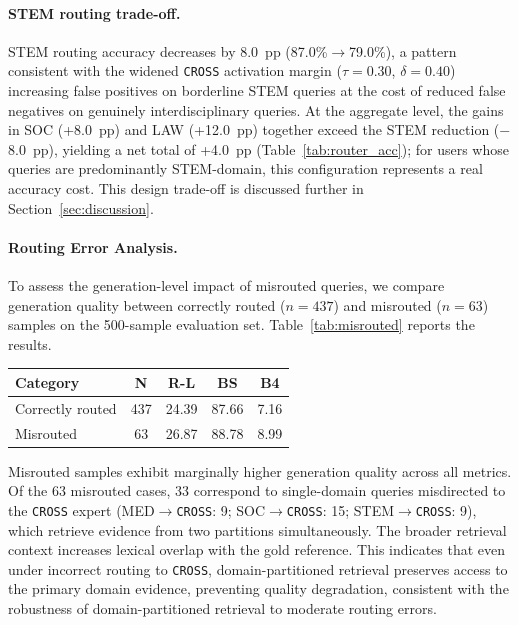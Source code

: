 \documentclass[a4paper,fleql]{cas-sc}
\begin{document}
\paragraph{STEM routing trade-off.}
STEM routing accuracy decreases by 8.0~pp (87.0\%$\to$79.0\%), a pattern
consistent with the widened \texttt{CROSS} activation margin ($\tau{=}0.30$,
$\delta{=}0.40$) increasing false positives on borderline STEM queries at
the cost of reduced false negatives on genuinely interdisciplinary queries.
At the aggregate level, the gains in SOC (+8.0~pp) and LAW (+12.0~pp) together
exceed the STEM reduction ($-$8.0~pp), yielding a net total of +4.0~pp
(Table~\ref{tab:router_acc}); for users whose queries are predominantly
STEM-domain, this configuration represents a real accuracy cost. This design trade-off is discussed further in
Section~\ref{sec:discussion}.

\paragraph{Routing Error Analysis.}
To assess the generation-level impact of misrouted queries, we compare
generation quality between correctly routed ($n{=}437$) and misrouted
($n{=}63$) samples on the 500-sample evaluation set.
Table~\ref{tab:misrouted} reports the results.

\vspace{6pt plus 4pt minus 3pt}
\begin{center}
\begingroup
{}
\label{tab:misrouted}
\begin{tabular}{lcccc}
\toprule
\textbf{Category} & \textbf{N} & \textbf{R-L} & \textbf{BS} & \textbf{B4} \\
\midrule
Correctly routed & 437 & 24.39 & 87.66 & 7.16 \\
Misrouted        &  63 & 26.87 & 88.78 & 8.99 \\
\bottomrule
\end{tabular}
\endgroup
\end{center}
\vspace{6pt plus 4pt minus 3pt}

Misrouted samples exhibit marginally higher generation quality across all
metrics. Of the 63 misrouted cases, 33 correspond to single-domain queries
misdirected to the \texttt{CROSS} expert (MED$\to$\texttt{CROSS}: 9;
SOC$\to$\texttt{CROSS}: 15; STEM$\to$\texttt{CROSS}: 9), which retrieve
evidence from two partitions
simultaneously. The broader retrieval context increases lexical overlap with
the gold reference. This indicates that even under incorrect routing to
\texttt{CROSS}, domain-partitioned retrieval preserves access to the primary
domain evidence, preventing quality degradation, consistent with the robustness
of domain-partitioned retrieval to moderate routing errors.
\end{document}
